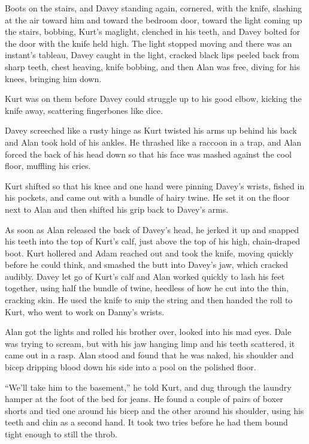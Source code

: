 Boots on the stairs, and Davey standing again, cornered, with the
knife, slashing at the air toward him and toward the bedroom door,
toward the light coming up the stairs, bobbing, Kurt's maglight,
clenched in his teeth, and Davey bolted for the door with the knife
held high.  The light stopped moving and there was an instant's
tableau, Davey caught in the light, cracked black lips peeled back
from sharp teeth, chest heaving, knife bobbing, and then Alan was
free, diving for his knees, bringing him down.

Kurt was on them before Davey could struggle up to his good elbow,
kicking the knife away, scattering fingerbones like dice.

Davey screeched like a rusty hinge as Kurt twisted his arms up behind
his back and Alan took hold of his ankles.  He thrashed like a raccoon
in a trap, and Alan forced the back of his head down so that his face
was mashed against the cool floor, muffling his cries.

Kurt shifted so that his knee and one hand were pinning Davey's
wrists, fished in his pockets, and came out with a bundle of hairy
twine.  He set it on the floor next to Alan and then shifted his grip
back to Davey's arms.

As soon as Alan released the back of Davey's head, he jerked it up and
snapped his teeth into the top of Kurt's calf, just above the top of
his high, chain-draped boot.  Kurt hollered and Adam reached out and
took the knife, moving quickly before he could think, and smashed the
butt into Davey's jaw, which cracked audibly.  Davey let go of Kurt's
calf and Alan worked quickly to lash his feet together, using half the
bundle of twine, heedless of how he cut into the thin, cracking skin. 
He used the knife to snip the string and then handed the roll to Kurt,
who went to work on Danny's wrists.

Alan got the lights and rolled his brother over, looked into his mad
eyes.  Dale was trying to scream, but with his jaw hanging limp and
his teeth scattered, it came out in a rasp.  Alan stood and found that
he was naked, his shoulder and bicep dripping blood down his side into
a pool on the polished floor.

``We'll take him to the basement,'' he told Kurt, and dug through the
laundry hamper at the foot of the bed for jeans.  He found a couple of
pairs of boxer shorts and tied one around his bicep and the other
around his shoulder, using his teeth and chin as a second hand.  It
took two tries before he had them bound tight enough to still the
throb.

